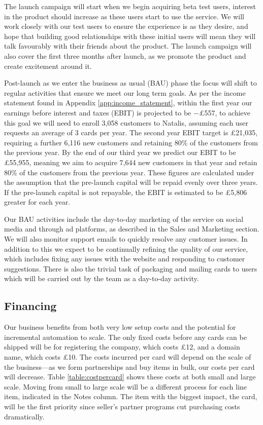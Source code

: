 \documentclass[10pt,a4paper]{article}
\begin{document}
The launch campaign will start when we begin acquiring beta test users, interest in the product should increase as these users start to use the service. We will work closely with our test users to ensure the experience is as they desire, and hope that building good relationships with these initial users will mean they will talk favourably with their friends about the product. The launch campaign will also cover the first three months after launch, as we promote the product and create excitement around it.

Post-launch as we enter the business as usual (BAU) phase the focus will shift to regular activities that ensure we meet our long term goals. As per the income statement found in Appendix \ref{app:income_statement}, within the first year our earnings before interest and taxes (EBIT) is projected to be $-$\pounds557, to achieve this goal we will need to enroll 3,058 customers to Natalis, assuming each user requests an average of 3 cards per year. The second year EBIT target is \pounds21,035, requiring a further 6,116 new customers and retaining 80\% of the customers from the previous year. By the end of our third year we predict our EBIT to be \pounds55,955, meaning we aim to acquire 7,644 new customers in that year and retain 80\% of the customers from the previous year. These figures are calculated under the assumption that the pre-launch capital will be repaid evenly over three years. If the pre-launch capital is not repayable, the EBIT is estimated to be \pounds5,806 greater for each year. 

Our BAU activities include the day-to-day marketing of the service on social media and through ad platforms, as described in the Sales and Marketing section. We will also monitor support emails to quickly resolve any customer issues. In addition to this we expect to be continually refining the quality of our service, which includes fixing any issues with the website and responding to customer suggestions. There is also the trivial task of packaging and mailing cards to users which will be carried out by the team as a day-to-day activity.

\subsection*{Financing}

Our business benefits from both very low setup costs and the potential for incremental automation to scale. The only fixed costs before any cards can be shipped will be for registering the company, which costs £12, and a domain name, which costs £10. The costs incurred per card will depend on the scale of the business---as we form partnerships and buy items in bulk, our costs per card will decrease. Table \ref{table:costpercard} shows these costs at both small and large scale. Moving from small to large scale will be a different process for each line item, indicated in the Notes column. The item with the biggest impact, the card, will be the first priority since seller's partner programs cut purchasing costs dramatically.
\end{document}
